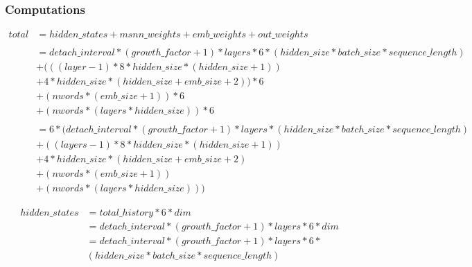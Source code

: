 \subsubsection{Computations}
\vspace{-2em}
\begin{equation}
\begin{aligned}
total 
&= hidden\_states + msnn\_weights + emb\_weights + out\_weights \\\\
&= detach\_interval * (growth\_factor + 1) * layers * 6 * (hidden\_size * batch\_size * sequence\_length) \\
& + (((layer - 1) * 8 * hidden\_size * (hidden\_size + 1)) \\
& + 4 * hidden\_size * (hidden\_size + emb\_size + 2)) * 6  \\
& + (nwords * (emb\_size + 1)) * 6 \\
& + (nwords * (layers * hidden\_size)) * 6 \\\\
&= 6 * (detach\_interval * (growth\_factor + 1) * layers * 
(hidden\_size * batch\_size * sequence\_length) \\
& + ((layers - 1) * 8 * hidden\_size * (hidden\_size + 1)) \\
& + 4 * hidden\_size * (hidden\_size + emb\_size + 2)  \\
& + (nwords * (emb\_size + 1)) \\
& + (nwords * (layers * hidden\_size)))
\end{aligned}
\end{equation}

\begin{equation}
\begin{aligned}
hidden\_states &= total\_history * 6 * dim \\
               &= detach\_interval * (growth\_factor + 1) * layers * 6 * dim \\
               &= detach\_interval * (growth\_factor + 1) * layers * 6 * \\
               & (hidden\_size * batch\_size * sequence\_length)
\end{aligned}
\end{equation}

